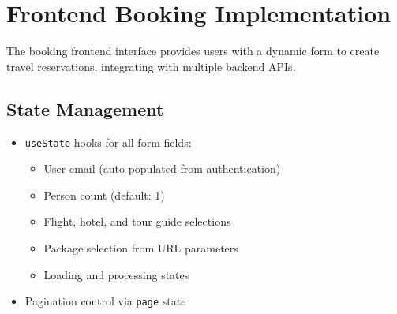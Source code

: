 \section{Frontend Booking Implementation}

The booking frontend interface provides users with a dynamic form to create travel reservations, integrating with multiple backend APIs.

\subsection{State Management}
\begin{itemize}
    \item \texttt{useState} hooks for all form fields:
    \begin{itemize}
        \item User email (auto-populated from authentication)
        \item Person count (default: 1)
        \item Flight, hotel, and tour guide selections
        \item Package selection from URL parameters
        \item Loading and processing states
    \end{itemize}
    \item Pagination control via \texttt{page} state
\end{itemize}

